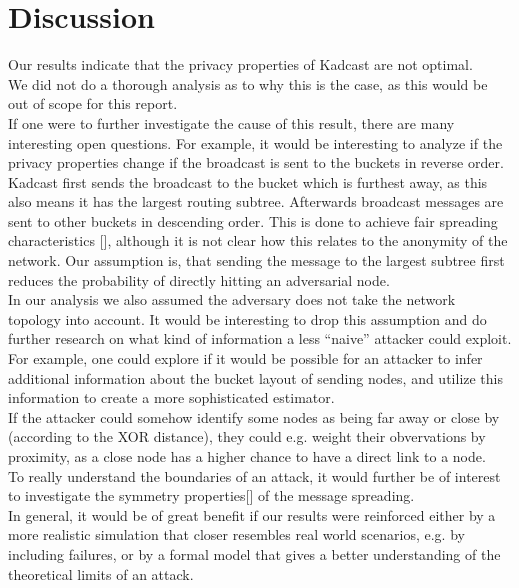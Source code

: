 \section{Discussion\label{discussion}}
Our results indicate that the privacy properties of Kadcast are not optimal. \\
We did not do a thorough analysis as to why this is the case, as this would
be out of scope for this report. \\
If one were to further investigate the cause of this result, there are
many interesting open questions.
For example, it would be interesting to analyze if the privacy properties change
if the broadcast is sent to the buckets in reverse order. Kadcast
first sends the broadcast to the bucket which is furthest away, as this also
means it has the largest routing subtree. Afterwards broadcast messages
are sent to other buckets in descending order. This is done to achieve
fair spreading characteristics [], although it is not clear how this
relates to the anonymity of the network. Our assumption is, that sending
the message to the largest subtree first reduces the probability of
directly hitting an adversarial node. \\
In our analysis we also assumed the adversary does not take the network topology into account.
It would be interesting to drop this assumption and do further research on what kind of
information a less ``naive'' attacker could exploit. \\
For example, one could explore if it would be possible for an attacker to infer additional information
about the bucket layout of sending nodes, and utilize this information to create a more sophisticated estimator. \\
If the attacker could somehow identify some nodes as being far away or close by (according to the XOR distance),
they could e.g. weight their obvervations by proximity, as a close node has a higher chance to have a direct link
to a node. \\
To really understand the boundaries of an attack, it would further be of interest to
investigate the symmetry properties[] of the message spreading. \\
In general, it would be of great benefit if our results were reinforced either
by a more realistic simulation that closer resembles real world
scenarios, e.g. by including failures, or
by a formal model that gives a better understanding of the theoretical
limits of an attack.

